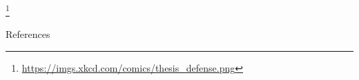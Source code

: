 \documentclass{beamer}
\begin{document}
    \begin{frame}
        \centering
        \footnote{\url{https://imgs.xkcd.com/comics/thesis_defense.png}}
    \end{frame}

    \begin{frame}{References}
        \printbibliography
    \end{frame}
\end{document}
